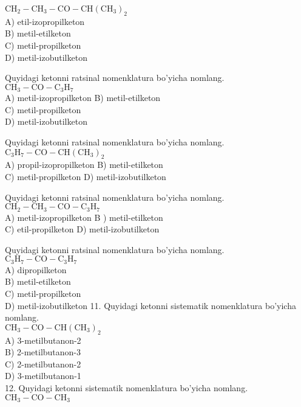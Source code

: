 $\mathrm{CH}_{2}-\mathrm{CH}_{3}-\mathrm{CO}-\mathrm{CH}\left(\mathrm{CH}_{3}\right)_{2}$\\
A) etil-izopropilketon\\
B) metil-etilketon\\
C) metil-propilketon\\
D) metil-izobutilketon
  \item Quyidagi ketonni ratsinal nomenklatura bo'yicha nomlang.\\
$\mathrm{CH}_{3}-\mathrm{CO}-\mathrm{C}_{3} \mathrm{H}_{7}$\\
A) metil-izopropilketon 
B) metil-etilketon\\
C) metil-propilketon\\ 
D) metil-izobutilketon
  \item Quyidagi ketonni ratsinal nomenklatura bo'yicha nomlang.\\
$\mathrm{C}_{3} \mathrm{H}_{7}-\mathrm{CO}-\mathrm{CH}\left(\mathrm{CH}_{3}\right)_{2}$\\
A) propil-izopropilketon 
B) metil-etilketon\\
C) metil-propilketon 
D) metil-izobutilketon
  \item Quyidagi ketonni ratsinal nomenklatura bo'yicha nomlang.\\
$\mathrm{CH}_{2}-\mathrm{CH}_{3}-\mathrm{CO}-\mathrm{C}_{3} \mathrm{H}_{7}$\\
A) metil-izopropilketon B ) metil-etilketon\\
C) etil-propilketon D) metil-izobutilketon
  \item Quyidagi ketonni ratsinal nomenklatura bo'yicha nomlang.\\
$\mathrm{C}_{3} \mathrm{H}_{7}-\mathrm{CO}-\mathrm{C}_{3} \mathrm{H}_{7}$\\
A) dipropilketon\\
B) metil-etilketon\\
C) metil-propilketon\\
D) metil-izobutilketon
11. Quyidagi ketonni sistematik nomenklatura bo'yicha nomlang.\\
$\mathrm{CH}_{3}-\mathrm{CO}-\mathrm{CH}\left(\mathrm{CH}_{3}\right)_{2}$\\
A) 3-metilbutanon-2\\
B) 2-metilbutanon-3\\
C) 2-metilbutanon-2\\
D) 3-metilbutanon-1\\
12. Quyidagi ketonni sistematik nomenklatura bo'yicha nomlang. $\mathrm{CH}_{3}-\mathrm{CO}-\mathrm{CH}_{3}$\\
